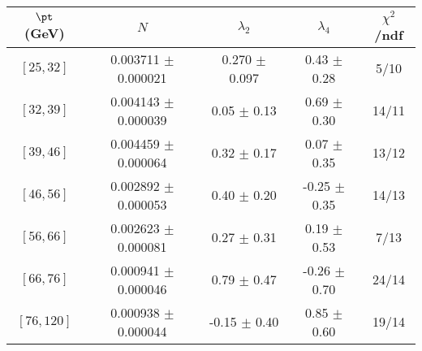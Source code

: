\begin{tabular}{c||c|c|c|c}
$\pt$ (GeV) & $N$ & $\lambda_{2}$ & $\lambda_4$  & $\chi^2$/ndf  \\
\hline
$[25, 32]$ & 0.003711 $\pm$ 0.000021 & 0.270 $\pm$ 0.097 & 0.43 $\pm$ 0.28 & 5/10\\
$[32, 39]$ & 0.004143 $\pm$ 0.000039 & 0.05 $\pm$ 0.13 & 0.69 $\pm$ 0.30 & 14/11\\
$[39, 46]$ & 0.004459 $\pm$ 0.000064 & 0.32 $\pm$ 0.17 & 0.07 $\pm$ 0.35 & 13/12\\
$[46, 56]$ & 0.002892 $\pm$ 0.000053 & 0.40 $\pm$ 0.20 & -0.25 $\pm$ 0.35 & 14/13\\
$[56, 66]$ & 0.002623 $\pm$ 0.000081 & 0.27 $\pm$ 0.31 & 0.19 $\pm$ 0.53 & 7/13\\
$[66, 76]$ & 0.000941 $\pm$ 0.000046 & 0.79 $\pm$ 0.47 & -0.26 $\pm$ 0.70 & 24/14\\
$[76, 120]$ & 0.000938 $\pm$ 0.000044 & -0.15 $\pm$ 0.40 & 0.85 $\pm$ 0.60 & 19/14\\
\end{tabular}
